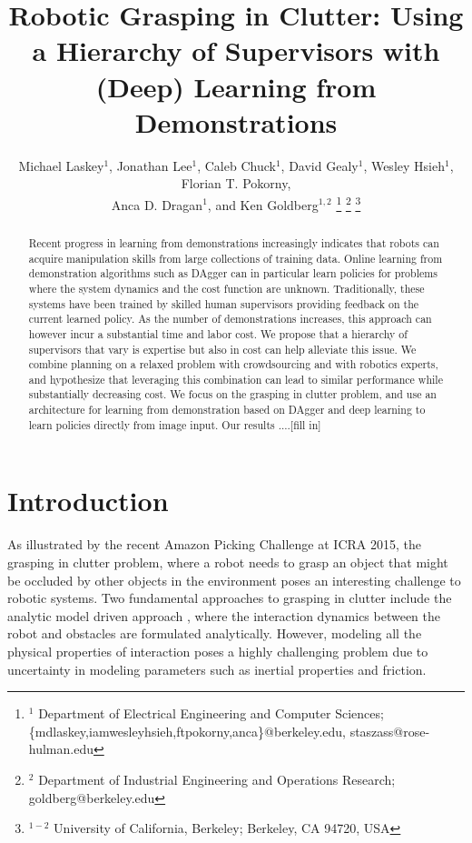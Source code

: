 \documentclass[10pt, conference]{ieeeconf}      %
\title{Robotic Grasping in Clutter: Using a Hierarchy of Supervisors with  (Deep) Learning from Demonstrations}
\author{Michael Laskey$^1$, Jonathan Lee$^1$, Caleb Chuck$^1$, David Gealy$^1$, Wesley Hsieh$^1$, Florian T. Pokorny,\\
 Anca D. Dragan$^1$, and Ken Goldberg$^{1,2}$%
\thanks{$^1$ Department of Electrical Engineering and Computer Sciences; {\small \{mdlaskey,iamwesleyhsieh,ftpokorny,anca\}@berkeley.edu, \small staszass@rose-hulman.edu} }%
\thanks{$^2$ Department of Industrial Engineering and Operations Research; {\small goldberg@berkeley.edu}}%
\thanks{$^{1-2}$ University of California, Berkeley;  Berkeley, CA 94720, USA}%
}
\begin{document}
\maketitle
\thispagestyle{empty}
\pagestyle{empty}



\begin{abstract}
Recent progress in learning from demonstrations increasingly indicates that robots can acquire manipulation skills from
large collections of training data. Online learning from demonstration algorithms such as DAgger can in particular learn
policies for problems where the system dynamics and the cost function are unknown. Traditionally, these systems have
been trained by skilled human supervisors providing feedback on the current learned policy. As the number of
demonstrations increases, this approach can however incur a substantial time and labor cost. We propose that a hierarchy of supervisors that vary is expertise but also in cost can help alleviate this issue. We combine planning on a relaxed problem with crowdsourcing and with robotics experts, and hypothesize that leveraging this combination can lead to similar performance while substantially decreasing cost. We focus on the grasping in clutter problem, and use an architecture for learning from demonstration based on DAgger and deep learning to learn policies directly from image input. Our results ....[fill in]

 \end{abstract}



\section{Introduction} 
As illustrated by the recent Amazon Picking Challenge at ICRA 2015, the grasping in clutter problem, where a robot needs
to grasp an object that might be occluded by other objects in the environment poses an interesting challenge to robotic
systems. Two fundamental approaches to grasping in clutter include the analytic model driven approach \cite{1,2,3},
where the interaction dynamics between the robot and obstacles are formulated analytically. However, modeling all the 
physical properties of interaction poses a highly challenging problem due to uncertainty in modeling parameters such as
inertial properties and friction. 
\end{document}
